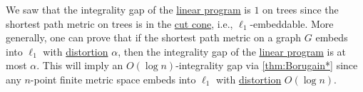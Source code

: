 We saw that the integrality gap of the \hyperref[eq:non-uniform-sparsest-cut-LP-primal]{linear program} is \(1\) on trees since the shortest path metric on trees is in the \hyperref[def:cut-cone]{cut cone}, i.e., \(\ell _1\)-embeddable. More generally, one can prove that if the shortest path metric on a graph \(G\) embeds into \(\ell _1\) with \hyperref[def:distortion]{distortion} \(\alpha \), then the integrality gap of the \hyperref[eq:non-uniform-sparsest-cut-LP-primal]{linear program} is at most \(\alpha \). This will imply an \(O(\log n)\)-integrality gap via \autoref{thm:Borugain*} since any \(n\)-point finite metric space embeds into \(\ell _1\) with \hyperref[def:distortion]{distortion} \(O(\log n)\).